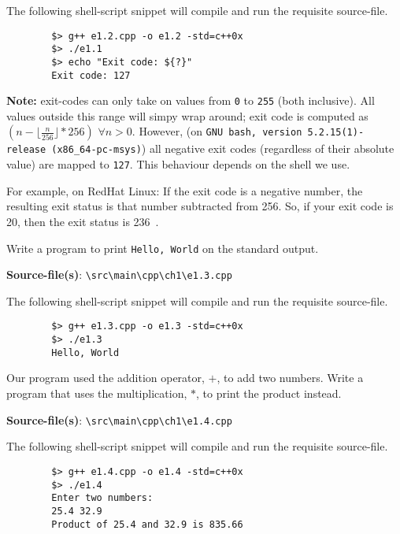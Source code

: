 \documentclass[12pt, a4paper]{article}
\begin{document}
    \noindent The following shell-script snippet will compile and run the requisite source-file.
    \begin{verbatim}
        $> g++ e1.2.cpp -o e1.2 -std=c++0x
        $> ./e1.1
        $> echo "Exit code: ${?}"
        Exit code: 127
    \end{verbatim}

    \noindent\textbf{Note:} exit-codes can only take on values from \texttt{0} to \texttt{255} (both inclusive).
    All values outside this range will simpy wrap around; exit code is computed as $(n - \lfloor\frac{n}{256}\rfloor * 256)\,\,\forall n > 0$.
    However, (on \texttt{GNU bash, version 5.2.15(1)-release (x86\_64-pc-msys)}) all negative exit codes (regardless of their absolute value) are mapped to \texttt{127}.
    This behaviour depends on the shell we use.

    \noindent For example, on RedHat Linux: If the exit code is a negative number, the resulting exit status is that number subtracted from 256.
    So, if your exit code is 20, then the exit status is 236~\cite{rhl-neg-exit-code}.

    \bigskip
    \begin{tcolorbox}[title={Exercise: 1.3}]
        Write a program to print \texttt{Hello, World} on the standard output.
    \end{tcolorbox}
    \noindent\textbf{Source-file(s)}: \texttt{\textbackslash src\textbackslash main\textbackslash cpp\textbackslash ch1\textbackslash e1.3.cpp}

    \noindent The following shell-script snippet will compile and run the requisite source-file.
    \begin{verbatim}
        $> g++ e1.3.cpp -o e1.3 -std=c++0x
        $> ./e1.3
        Hello, World
    \end{verbatim}

    \bigskip
    \begin{tcolorbox}[title={Exercise: 1.4}]
        Our program used the addition operator, $+$, to add two numbers.
        Write a program that uses the multiplication, $*$, to print the product instead.
    \end{tcolorbox}
    \noindent\textbf{Source-file(s)}: \texttt{\textbackslash src\textbackslash main\textbackslash cpp\textbackslash ch1\textbackslash e1.4.cpp}

    \noindent The following shell-script snippet will compile and run the requisite source-file.
    \begin{verbatim}
        $> g++ e1.4.cpp -o e1.4 -std=c++0x
        $> ./e1.4
        Enter two numbers:
        25.4 32.9
        Product of 25.4 and 32.9 is 835.66
    \end{verbatim}
\end{document}
